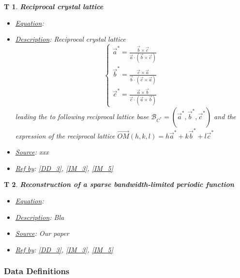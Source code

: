 \documentclass[12pt]{article}
\newtheorem{T}{T}
\begin{document}
\begin{T}
\label{T_3}
\noindent\colorbox{shadecolorT}{\normalfont \textbf{Reciprocal crystal lattice}}
\normalfont
\begin{itemize}
\item \underline{Equation}: 
\item \underline{Description}: Reciprocal crystal lattice
\begin{equation}
\begin{cases}
\vec{a}^{*} = \frac{\vec{b}\times \vec{c}}{\vec{a}\cdot(\vec{b}\times \vec{c})} \\
\vec{b}^{*} = \frac{\vec{c}\times \vec{a}}{\vec{b}\cdot(\vec{c}\times \vec{a})} \\
\vec{c}^{*} = \frac{\vec{a}\times \vec{b}}{\vec{c}\cdot(\vec{a}\times \vec{b})}
\end{cases}
\label{eq:rec_crystal_1}
\end{equation}
leading the to following reciprocal lattice base $\mathcal{B}_{C^{*}}=(\vec{a}^{*}, \vec{b}^{*}, \vec{c}^{*})$ and the expression of the reciprocal lattice $\vec{OM}(h,k,l) = h\vec{a}^{*} + k\vec{b}^{*} + l\vec{c}^{*}$
\item \underline{Source}: xxx
\item \underline{Ref by}: \cref{DD_3}, \cref{IM_3}, \cref{IM_5}
\end{itemize}
\end{T}

\begin{T}
\label{T_4}
\noindent\colorbox{shadecolorT}{\normalfont \textbf{Reconstruction of a sparse bandwidth-limited periodic function}}
\normalfont
\begin{itemize}
\item \underline{Equation}: 
\item \underline{Description}: Bla
\item \underline{Source}: Our paper
\item \underline{Ref by}: \cref{DD_3}, \cref{IM_3}, \cref{IM_5}
\end{itemize}
\end{T}

\subsubsection{Data Definitions}\label{sec_datadef}

\renewcommand{\labelitemi}{$\star$}
\end{document}
